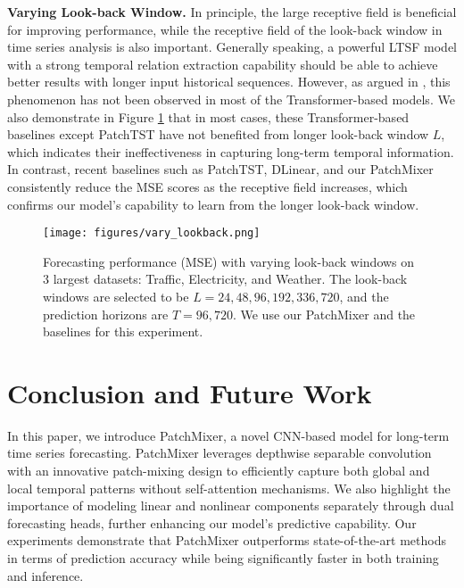 \documentclass{article} \usepackage{iclr2024_conference,times}
\begin{document}
\noindent \textbf{Varying Look-back Window.} In principle, the large receptive field is beneficial for improving performance, while the receptive field of the look-back window in time series analysis is also important. Generally speaking, a powerful LTSF model with a strong temporal relation extraction capability should be able to achieve better results with longer input historical sequences. However, as argued in \citet{dlinear}, this phenomenon has not been observed in most of the Transformer-based models. We also demonstrate in Figure \ref{fig::varying_lookback} that in most cases, these Transformer-based baselines except PatchTST have not benefited from longer look-back window $L$, which indicates their ineffectiveness in capturing long-term temporal information. In contrast, recent baselines such as PatchTST, DLinear, and our PatchMixer consistently reduce the MSE scores as the receptive field increases, which confirms our model's capability to learn from the longer look-back window.

\begin{figure}[h]
\begin{center}
\texttt{[image: figures/vary\_lookback.png]}
\end{center}
\caption[Forecasting performance (MSE) with varying look-back windows on $3$ largest datasets]{Forecasting performance (MSE) with varying look-back windows on $3$ largest datasets: Traffic, Electricity, and Weather. The look-back windows are selected to be $L=24,48,96,192,336,720$, and the prediction horizons are $T=96, 720$. We use our PatchMixer and the baselines for this experiment.\footnotemark}
\label{fig::varying_lookback}
\end{figure}


\section{Conclusion and Future Work}

In this paper, we introduce PatchMixer, a novel CNN-based model for long-term time series forecasting. PatchMixer leverages depthwise separable convolution with an innovative patch-mixing design to efficiently capture both global and local temporal patterns without self-attention mechanisms. We also highlight the importance of modeling linear and nonlinear components separately through dual forecasting heads, further enhancing our model's predictive capability. Our experiments demonstrate that PatchMixer outperforms state-of-the-art methods in terms of prediction accuracy while being significantly faster in both training and inference. 
\end{document}
